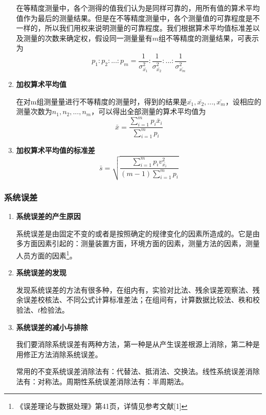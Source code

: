 \begin{enumerate}
	\qquad 在等精度测量中，各个测得的值我们认为是同样可靠的，用所有值的算术平均值作为最后的测量结果。但是在不等精度测量中，各个测量值的可靠程度是不一样的，所以我们用权来说明测量的可靠程度。我们根据算术平均值标准差以及测量的次数来确定权，假设同一测量量有$ m $组不等精度的测量结果，可表示为\[ p_1:p_2:...:p_m=\frac{1}{\sigma_{\bar{x_1}}^2}:\frac{1}{\sigma_{\bar{x_2}}^2}:...:\frac{1}{\sigma_{\bar{x_m}}^2} \]
	\item \textbf{加权算术平均值}
	
	\qquad 在对m组测量量进行不等精度的测量时，得到的结果是$ \bar{x_1},\bar{x_2},...,\bar{x_m} $，设相应的测量次数为$ n_1,n_2,...,n_m $，可以得出全部测量的算术平均值为\[ \bar{x}=\frac{\sum\limits_{i=1}^{m}p_i\bar{x}_i}{\sum\limits_{i=1}^{m}p_i} \]
	\item \textbf{加权算术平均值的标准差}\[ \bar{s}=\sqrt{\frac{\sum\limits_{i=1}^{m}p_iv_{\bar{x_i}}^2}{(m-1)\sum\limits_{i=1}^{m}p_i}} \]
\end{enumerate}
\subsubsection{系统误差}
\begin{enumerate}
	\item \textbf{系统误差的产生原因}
	
	\qquad 系统误差是由固定不变的或者是按照确定的规律变化的因素所造成的。它是由多方面因素引起的：测量装置方面，环境方面的因素，测量方法的因素，测量人员方面的因素\footnote{《误差理论与数据处理》第41页，详情见参考文献[1]}。
	\item \textbf{系统误差的发现}
	
	\qquad 发现系统误差的方法有很多种，在组内有，实验对比法、残余误差观察法、残余误差校核法、不同公式计算标准差法；在组间有，计算数据比较法、秩和校验法、$ t $检验法。
	\item \textbf{系统误差的减小与排除}
	
	\qquad 我们要消除系统误差有两种方法，第一种是从产生误差根源上消除，第二种是用修正方法消除系统误差。
	
	\qquad 常用的不变系统误差消除法有：代替法、抵消法、交换法。线性系统误差消除法有：对称法。周期性系统误差消除法有：半周期法。
\end{enumerate}
